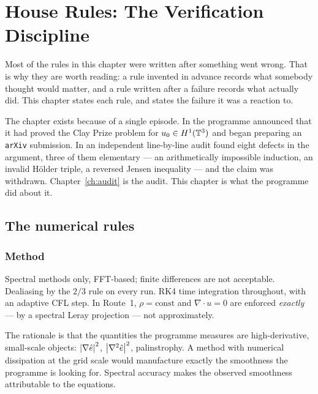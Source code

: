 \chapter{House Rules: The Verification Discipline}
\label{ch:house-rules}

Most of the rules in this chapter were written after something went wrong.
That is why they are worth reading: a rule invented in advance records what
somebody thought would matter, and a rule written after a failure records what
actually did. This chapter states each rule, and states the failure it was a
reaction to.

The chapter exists because of a single episode. In  the programme
announced that it had proved the Clay Prize problem for \(u_0\in H^1(\mathbb{T}^3)\)
and began preparing an \texttt{arXiv} submission. In  an independent
line-by-line audit found eight defects in the argument, three of them
elementary --- an arithmetically impossible induction, an invalid H\"older
triple, a reversed Jensen inequality --- and the claim was withdrawn.
Chapter~\ref{ch:audit} is the audit. This chapter is what the programme did
about it.

\section{The numerical rules}
\label{sec:numerical-rules}

\subsection{Method}

Spectral methods only, FFT-based; finite differences are not acceptable.
Dealiasing by the \(2/3\) rule on every run. RK4 time integration throughout,
with an adaptive CFL step. In Route~1, \(\rho=\mathrm{const}\) and
\(\nabla\cdot u=0\) are enforced \emph{exactly} --- by a spectral Leray
projection --- not approximately.

The rationale is that the quantities the programme measures are
high-derivative, small-scale objects: \(\left|\nabla\hat{e}\right|^2\),
\(\left|\nabla^2\hat{e}\right|^2\), palinstrophy. A method with numerical dissipation
at the grid scale would manufacture exactly the smoothness the programme is
looking for. Spectral accuracy makes the observed smoothness attributable to
the equations.

